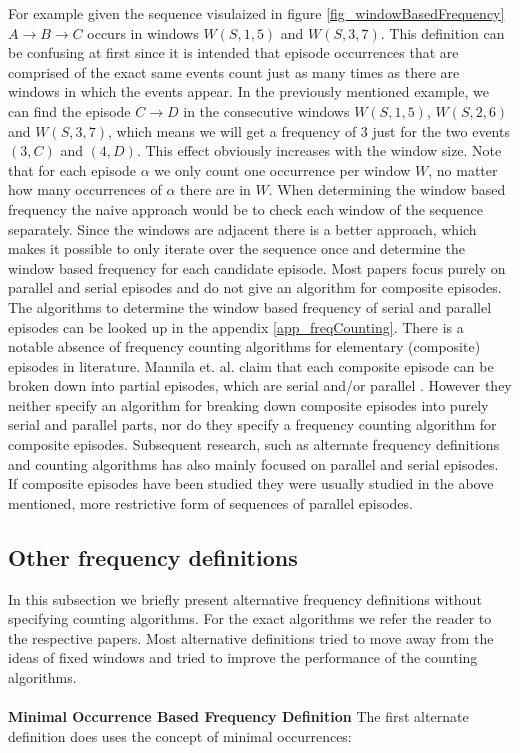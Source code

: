 For example given the sequence visulaized in figure \ref{fig_windowBasedFrequency} $A \rightarrow B \rightarrow C$ occurs in windows $W(S,1,5)$ and $W(S,3,7)$. \newline 
This definition can be confusing at first since it is intended that episode occurrences that are comprised of the exact same events count just as many times as there are windows in which the events appear. In the previously mentioned example, we can find the episode $C \rightarrow D$ in the consecutive windows $W(S,1,5)$, $W(S,2,6)$ and $W(S,3,7)$, which means we will get a frequency of $3$ just for the two events $(3,C)$ and $(4,D)$. This effect obviously increases with the window size. Note that for each episode $\alpha$ we only count one occurrence per window $W$, no matter how many occurrences of $\alpha$ there are in $W$.\newline
When determining the window based frequency the naive approach would be to check each window of the sequence separately. Since the windows are adjacent there is a better approach, which makes it possible to only iterate over the sequence once and determine the window based frequency for each candidate episode. Most papers focus purely on parallel and serial episodes and do not give an algorithm for composite episodes. The algorithms to determine the window based frequency of serial and parallel episodes can be looked up in the appendix \ref{app_freqCounting}.
There is a notable absence of frequency counting algorithms for elementary (composite) episodes in literature. Mannila et. al. claim that each composite episode can be broken down into partial episodes, which are serial and/or parallel \cite{mannila1997discovery}. However they neither specify an algorithm for breaking down composite episodes into purely serial and parallel parts, nor do they specify a frequency counting algorithm for composite episodes. Subsequent research, such as alternate frequency definitions and counting algorithms has also mainly focused on parallel and serial episodes. If composite episodes have been studied they were usually studied in the above mentioned, more restrictive form of sequences of parallel episodes. \newline

\subsection{Other frequency definitions}
\label{subsec_otherFrequency}

In this subsection we briefly present alternative frequency definitions without specifying counting algorithms. For the exact algorithms we refer the reader to the respective papers. \newline
Most alternative definitions tried to move away from the ideas of fixed windows and tried to improve the performance of the counting algorithms. \\
\\
\textbf{Minimal Occurrence Based Frequency Definition} \newline
The first alternate definition does uses the concept of minimal occurrences:

